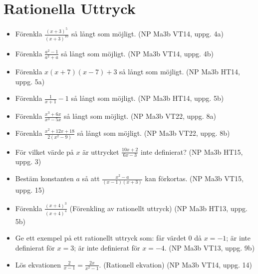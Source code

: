 \documentclass{article}
\begin{document}
\section{Rationella Uttryck}
\begin{itemize}
    \item Förenkla $\frac{(x+3)^5}{(x+3)^{10}}$ så långt som möjligt. (NP Ma3b VT14, uppg. 4a)
    \item Förenkla $\frac{a^2-1}{a^2+a}$ så långt som möjligt. (NP Ma3b VT14, uppg. 4b)
    \item Förenkla $x(x+7)(x-7)+3$ så långt som möjligt. (NP Ma3b HT14, uppg. 5a)
    \item Förenkla $\frac{1}{x+1} - 1$ så långt som möjligt. (NP Ma3b HT14, uppg. 5b)
    \item Förenkla $\frac{x^3+6x}{x^3-5x}$ så långt som möjligt. (NP Ma3b VT22, uppg. 8a)
    \item Förenkla $\frac{x^2+12x+18}{2(x^2-9)}$ så långt som möjligt. (NP Ma3b VT22, uppg. 8b)
    \item För vilket värde på $x$ är uttrycket $\frac{10x+2}{6x-3}$ inte definierat? (NP Ma3b HT15, uppg. 3)
    \item Bestäm konstanten $a$ så att $\frac{x^2-a}{(x-1)(x+3)}$ kan förkortas. (NP Ma3b VT15, uppg. 15)
    \item Förenkla $\frac{(x+4)^3}{(x+4)^4}$ (Förenkling av rationellt uttryck) (NP Ma3b HT13, uppg. 5b)
    \item Ge ett exempel på ett rationellt uttryck som: får värdet 0 då $x=-1$; är inte definierat för $x=3$; är inte definierat för $x=-4$. (NP Ma3b VT13, uppg. 9b)
    \item Lös ekvationen $\frac{2}{x-1} = \frac{2x}{x^2-1}$. (Rationell ekvation) (NP Ma3b VT14, uppg. 14)
\end{itemize}
\end{document}
